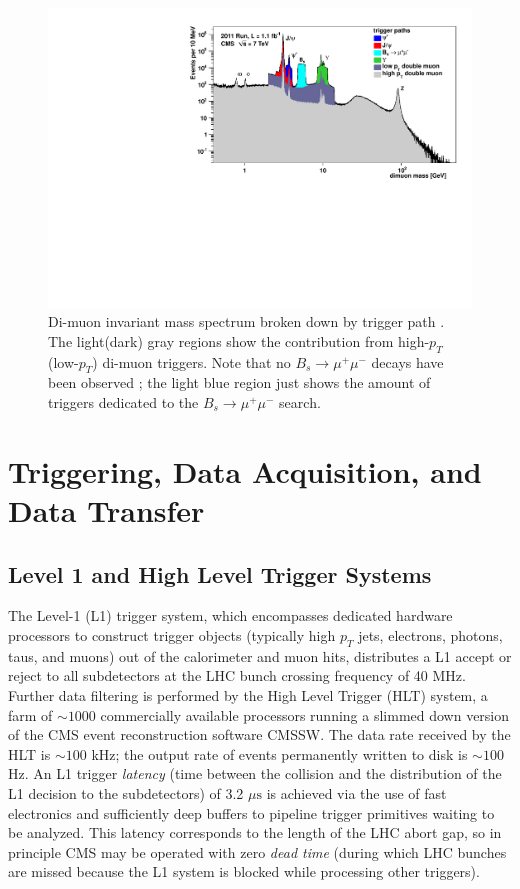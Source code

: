\documentclass[dissertation.tex]{subfiles}
\begin{document}
\begin{figure}
	\centering
	\includegraphics[scale=0.7]{muon_inv_mass}
	\caption{Di-muon invariant mass spectrum broken down by trigger path \cite{MUO_POG_Twiki_inv_mass}.  The light(dark) gray regions show the contribution from high-$p_{T}$(low-$p_{T}$) di-muon triggers.  Note that no $B_{s}\rightarrow\mu^{+}\mu^{-}$ decays have been observed \cite{springerlink:10.1007/JHEP04(2012)033}; the light blue region just shows the amount of triggers dedicated to the $B_{s}\rightarrow\mu^{+}\mu^{-}$ search.}
	\label{fig:muon_inv_mass}
\end{figure}

\section{Triggering, Data Acquisition, and Data Transfer}
\label{sec:Triggering, Data Acquisition, and Data Transfer}

\subsection{Level 1 and High Level Trigger Systems}
\label{sec:Level 1 and High Level Trigger Systems}

The Level-1 (L1) trigger system, which encompasses dedicated hardware processors to construct trigger objects (typically high $p_{T}$ jets, electrons, photons, taus, and muons) out of the calorimeter and muon hits, distributes a L1 accept or reject to all subdetectors at the LHC bunch crossing frequency of 40 MHz.  Further data filtering is performed by the High Level Trigger (HLT) system, a farm of $\sim1000$ commercially available processors running a slimmed down version of the CMS event reconstruction software CMSSW.  The data rate received by the HLT is $\sim100$ kHz; the output rate of events permanently written to disk is $\sim100$ Hz.  An L1 trigger \textit{latency} (time between the collision and the distribution of the L1 decision to the subdetectors) of 3.2 $\mu\mbox{s}$ is achieved via the use of fast electronics and sufficiently deep buffers to pipeline trigger primitives waiting to be analyzed.  This latency corresponds to the length of the LHC abort gap, so in principle CMS may be operated with zero \textit{dead time} (during which LHC bunches are missed because the L1 system is blocked while processing other triggers).
\end{document}

